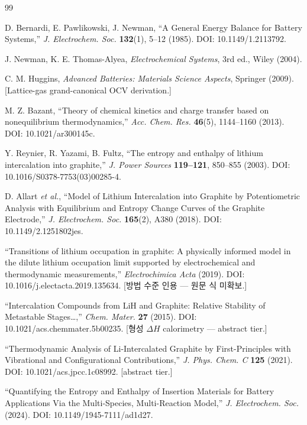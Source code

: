 \documentclass[11pt,a4paper]{article}
\begin{document}
\begin{thebibliography}{99}

D. Bernardi, E. Pawlikowski, J. Newman,
``A General Energy Balance for Battery Systems,''
\emph{J. Electrochem. Soc.} \textbf{132}(1), 5--12 (1985).
DOI: 10.1149/1.2113792.

J. Newman, K. E. Thomas-Alyea,
\emph{Electrochemical Systems}, 3rd ed., Wiley (2004).

C. M. Huggins,
\emph{Advanced Batteries: Materials Science Aspects},
Springer (2009). [Lattice-gas grand-canonical OCV derivation.]

M. Z. Bazant,
``Theory of chemical kinetics and charge transfer based on nonequilibrium thermodynamics,''
\emph{Acc. Chem. Res.} \textbf{46}(5), 1144--1160 (2013).
DOI: 10.1021/ar300145c.

Y. Reynier, R. Yazami, B. Fultz,
``The entropy and enthalpy of lithium intercalation into graphite,''
\emph{J. Power Sources} \textbf{119--121}, 850--855 (2003).
DOI: 10.1016/S0378-7753(03)00285-4.

D. Allart \emph{et al.},
``Model of Lithium Intercalation into Graphite by Potentiometric Analysis with
Equilibrium and Entropy Change Curves of the Graphite Electrode,''
\emph{J. Electrochem. Soc.} \textbf{165}(2), A380 (2018).
DOI: 10.1149/2.1251802jes.

``Transitions of lithium occupation in graphite: A physically informed model in the
dilute lithium occupation limit supported by electrochemical and thermodynamic measurements,''
\emph{Electrochimica Acta} (2019).
DOI: 10.1016/j.electacta.2019.135634.
[방법 수준 인용 — 원문 식 미확보.]

``Intercalation Compounds from LiH and Graphite: Relative Stability of Metastable Stages\ldots,''
\emph{Chem. Mater.} \textbf{27} (2015).
DOI: 10.1021/acs.chemmater.5b00235.
[형성 $\Delta H$ calorimetry — abstract tier.]

``Thermodynamic Analysis of Li-Intercalated Graphite by First-Principles with
Vibrational and Configurational Contributions,''
\emph{J. Phys. Chem. C} \textbf{125} (2021).
DOI: 10.1021/acs.jpcc.1c08992.
[abstract tier.]

``Quantifying the Entropy and Enthalpy of Insertion Materials for Battery Applications
Via the Multi-Species, Multi-Reaction Model,''
\emph{J. Electrochem. Soc.} (2024).
DOI: 10.1149/1945-7111/ad1d27.


\end{thebibliography}
\end{document}
